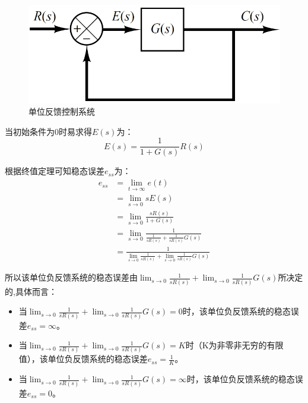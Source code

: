 \documentclass{article}
\numberwithin{equation}{section}
\numberwithin{figure}{section}
\begin{document}
\begin{figure}
    \centering
    \includegraphics[width=.6\textwidth]{Chapter5/UnitFeedbackControlSystem.png} %
    \caption{单位反馈控制系统} %
    \label{UnitFeedbackControlSystem} %
\end{figure}

当初始条件为0时易求得$E(s)$为：
\begin{equation}
    E(s)=\frac{1}{1+G(s)}R(s)
\end{equation}

根据终值定理可知稳态误差$e_{ss}$为：
\begin{equation}
    \begin{split}
        e_{ss}&=\lim_{t\rightarrow \infty}e(t)\\
        &=\lim_{s\rightarrow 0}sE(s)\\
        &=\lim_{s\rightarrow 0}\frac{sR(s)}{1+G(s)}\\
        &=\lim_{s\rightarrow 0}\frac{1}{\frac{1}{sR(s)}+\frac{1}{sR(s)}G(s)}\\
        &=\frac{1}{\lim_{s\rightarrow 0}\frac{1}{sR(s)}+\lim_{s\rightarrow 0}\frac{1}{sR(s)}G(s)}
    \end{split}
\end{equation}

所以该单位负反馈系统的稳态误差由$\lim_{s\rightarrow 0}\frac{1}{sR(s)}+\lim_{s\rightarrow 0}\frac{1}{sR(s)}G(s)$所决定的,具体而言：
\begin{itemize}
    \item 当$\lim_{s\rightarrow 0}\frac{1}{sR(s)}+\lim_{s\rightarrow 0}\frac{1}{sR(s)}G(s)=0$时，该单位负反馈系统的稳态误差$e_{ss}=\infty$。
    \item 当$\lim_{s\rightarrow 0}\frac{1}{sR(s)}+\lim_{s\rightarrow 0}\frac{1}{sR(s)}G(s)=K$时（K为非零非无穷的有限值），该单位负反馈系统的稳态误差$e_{ss}=\frac{1}{K}$。
    \item 当$\lim_{s\rightarrow 0}\frac{1}{sR(s)}+\lim_{s\rightarrow 0}\frac{1}{sR(s)}G(s)=\infty$时，该单位负反馈系统的稳态误差$e_{ss}=0$。
\end{itemize}
\end{document}
